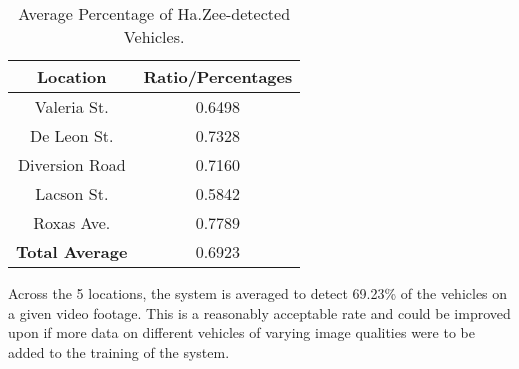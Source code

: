 \begin{table}[ht]   %
	\centering
	\caption{Average Percentage of Ha.Zee-detected Vehicles.} \vspace{0.25em}
	\begin{tabular}{c|c} \hline
		\centering \textbf {Location} & \textbf {Ratio/Percentages} \\ \hline
		Valeria St. & 0.6498 \\
		De Leon St. & 0.7328 	\\ 
		Diversion Road& 0.7160   \\ 
		Lacson St.   & 0.5842  \\ 
		Roxas Ave.  & 0.7789 \\ \hline
		
		\textbf{Total Average} & 0.6923 \\ \hline
		
	\end{tabular}
	\label{tab:avg_perc}
\end{table}


Across the 5 locations, the system is averaged to detect 69.23\% of the vehicles on a given video footage. This is a reasonably acceptable rate and could be improved upon if more data on different vehicles of varying image qualities were to be added to the training of the system.
